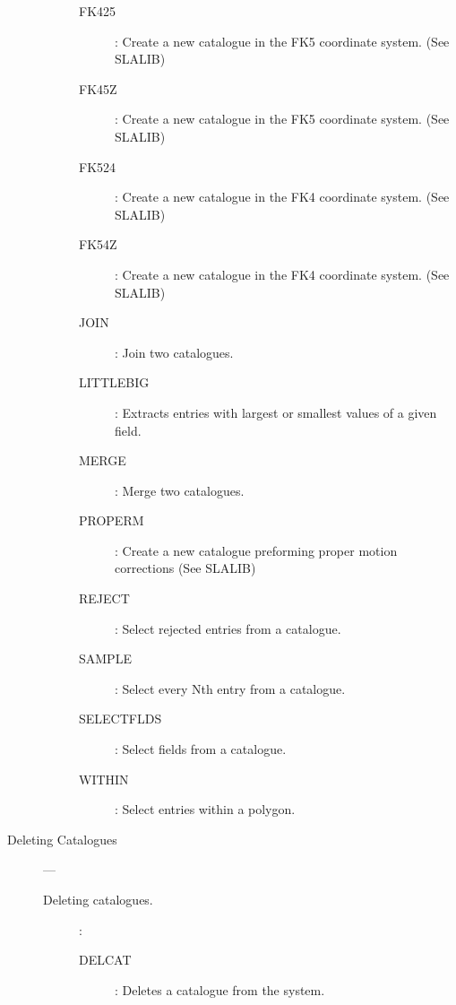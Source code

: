 \begin{description}
\begin{description}
\begin{description}
\item [FK425]:
 Create a new catalogue in the FK5 coordinate system. (See SLALIB)

\item [FK45Z]:
 Create a new catalogue in the FK5 coordinate system. (See SLALIB)

\item [FK524]:
 Create a new catalogue in the FK4 coordinate system. (See SLALIB)

\item [FK54Z]:
 Create a new catalogue in the FK4 coordinate system. (See SLALIB)

\item [JOIN]:
 Join two catalogues.

\item [LITTLEBIG]:
 Extracts entries with largest or smallest values of a given field.

\item [MERGE]:
 Merge two catalogues.

\item [PROPERM]:
 Create a new catalogue preforming proper motion corrections (See SLALIB)

\item [REJECT]:
 Select rejected entries from a catalogue.

\item [SAMPLE]:
 Select every Nth entry from a catalogue.

\item [SELECTFLDS]:
 Select fields from a catalogue.

\item [WITHIN]:
 Select entries within a polygon.

\end{description}

\end{description}

\item [Deleting Catalogues] ---

\begin{description}

\item [Deleting catalogues.]:

\begin {description}

\item [DELCAT]:
 Deletes a catalogue from the system.

\end{description}


\end{description}
\end{description}
